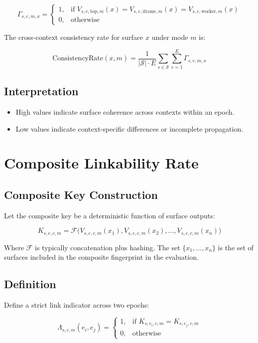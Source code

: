 \documentclass[11pt]{report}
\begin{document}
\[
\Gamma_{s,e,m,x} =
\begin{cases}
1, & \text{if } V_{s,e,\text{top},m}(x) = V_{s,e,\text{iframe},m}(x) = V_{s,e,\text{worker},m}(x) \\
0, & \text{otherwise}
\end{cases}
\]

The cross-context consistency rate for surface $x$ under mode $m$ is:

\[
\text{ConsistencyRate}(x,m) =
\frac{1}{|\mathcal{S}| \cdot E}
\sum_{s \in \mathcal{S}} \sum_{e=1}^{E}
\Gamma_{s,e,m,x}
\]

\subsection{Interpretation}

\begin{itemize}
    \item High values indicate surface coherence across contexts within an epoch.
    \item Low values indicate context-specific differences or incomplete propagation.
\end{itemize}

\section{Composite Linkability Rate}

\subsection{Composite Key Construction}

Let the composite key be a deterministic function of surface outputs:

\[
K_{s,e,c,m} = \mathcal{F}\Big(
V_{s,e,c,m}(x_1), V_{s,e,c,m}(x_2), \dots, V_{s,e,c,m}(x_n)
\Big)
\]

Where $\mathcal{F}$ is typically concatenation plus hashing. The set $\{x_1,\dots,x_n\}$ is the set of surfaces included in the composite fingerprint in the evaluation.

\subsection{Definition}

Define a strict link indicator across two epochs:

\[
\Lambda_{s,c,m}(e_i,e_j) =
\begin{cases}
1, & \text{if } K_{s,e_i,c,m} = K_{s,e_j,c,m} \\
0, & \text{otherwise}
\end{cases}
\]
\end{document}
